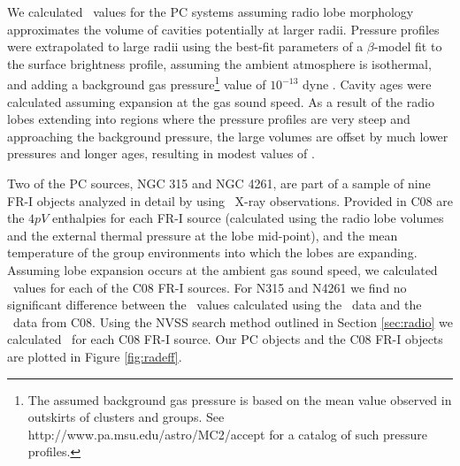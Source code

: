 \documentclass{emulateapj}
\begin{document}
We calculated \pcav\ values for the PC systems assuming radio lobe
morphology approximates the volume of cavities potentially at larger
radii. Pressure profiles were extrapolated to large radii using the
best-fit parameters of a $\beta$-model \citep{betamodel} fit to the
surface brightness profile, assuming the ambient atmosphere is
isothermal, and adding a background gas pressure\footnote{The assumed
  background gas pressure is based on the mean value observed in
  outskirts of clusters and groups. See
  http://www.pa.msu.edu/astro/MC2/accept for a catalog of such
  pressure profiles.} value of $10^{-13}$ dyne \pcmsq. Cavity ages
were calculated assuming expansion at the gas sound speed. As a result
of the radio lobes extending into regions where the pressure profiles
are very steep and approaching the background pressure, the large
volumes are offset by much lower pressures and longer ages, resulting
in modest values of \pcav.

Two of the PC sources, NGC 315 and NGC 4261, are part of a sample of
nine FR-I objects analyzed in detail by \citet[][hereafter
  C08]{2008MNRAS.386.1709C} using \xmm\ X-ray observations. Provided
in C08 are the $4pV$ enthalpies for each FR-I source (calculated using
the radio lobe volumes and the external thermal pressure at the lobe
mid-point), and the mean temperature of the group environments into
which the lobes are expanding. Assuming lobe expansion occurs at the
ambient gas sound speed, we calculated \pcav\ values for each of the
C08 FR-I sources. For N315 and N4261 we find no significant difference
between the \pcav\ values calculated using the \chandra\ data and the
\xmm\ data from C08. Using the NVSS search method outlined in Section
\ref{sec:radio} we calculated \phigh\ for each C08 FR-I source. Our PC
objects and the C08 FR-I objects are plotted in Figure
\ref{fig:radeff}.
\end{document}
